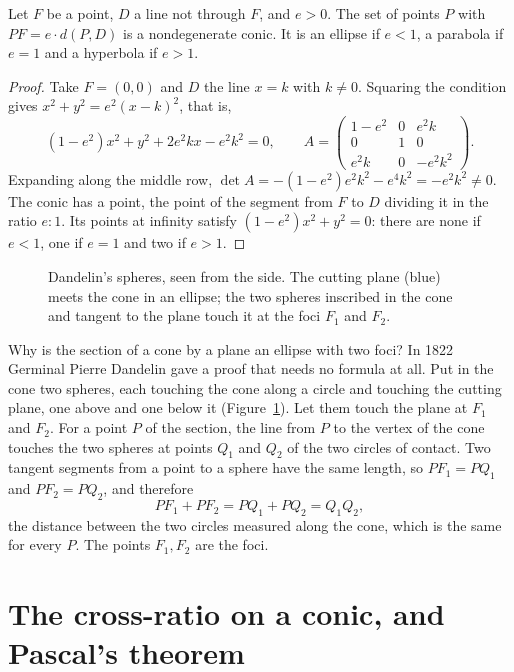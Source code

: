 \begin{proposition}\label{prop:focus}
Let $F$ be a point, $D$ a line not through $F$, and $e>0$. The set of points $P$ with $PF=e\cdot d(P,D)$ is a nondegenerate conic. It is an ellipse
if $e<1$, a parabola if $e=1$ and a hyperbola if $e>1$.
\end{proposition}

\begin{proof}
Take $F=(0,0)$ and $D$ the line $x=k$ with $k\ne0$. Squaring the condition gives $x^2+y^2=e^2(x-k)^2$, that is,
\[
(1-e^2)x^2+y^2+2e^2kx-e^2k^2=0,\qquad
A=\begin{pmatrix}1-e^2&0&e^2k\\0&1&0\\e^2k&0&-e^2k^2\end{pmatrix}.
\]
Expanding along the middle row, $\det A=-(1-e^2)e^2k^2-e^4k^2=-e^2k^2\ne0$. The conic has a point, the point of the segment from $F$ to $D$ dividing it
in the ratio $e:1$. Its points at infinity satisfy $(1-e^2)x^2+y^2=0$: there are none if $e<1$, one if $e=1$ and two if $e>1$.
\end{proof}

\begin{figure}[ht]
\centering
{}
\caption{Dandelin's spheres, seen from the side. The cutting plane (blue) meets the cone in an ellipse; the two spheres inscribed in the cone and
tangent to the plane touch it at the foci $F_1$ and $F_2$.}
\label{fig:dandelin}
\end{figure}

\begin{beauty}
Why is the section of a cone by a plane an ellipse with two foci? In 1822 Germinal Pierre Dandelin gave a proof that needs no formula at all. Put in the
cone two spheres, each touching the cone along a circle and touching the cutting plane, one above and one below it (Figure~\ref{fig:dandelin}). Let
them touch the plane at $F_1$ and $F_2$. For a point $P$ of the section, the line from $P$ to the vertex of the cone touches the two spheres at
points $Q_1$ and $Q_2$ of the two circles of contact. Two tangent segments from a point to a sphere have the same length, so $PF_1=PQ_1$ and
$PF_2=PQ_2$, and therefore
\[
PF_1+PF_2=PQ_1+PQ_2=Q_1Q_2,
\]
the distance between the two circles measured along the cone, which is the same for every $P$. The points $F_1,F_2$ are the foci.
\end{beauty}

\section{The cross-ratio on a conic, and Pascal's theorem}

